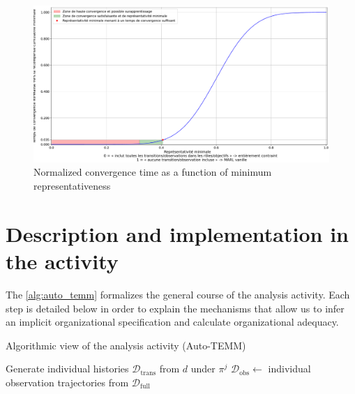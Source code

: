 \begin{itemize}
\begin{figure}[h!]
  \centering
  \includegraphics[trim=0cm 0cm 0cm 0cm, clip, width=1.\linewidth]{figures/convergence_time_relative_to_representativeness.pdf}
  \caption{Normalized convergence time as a function of minimum representativeness}
  \label {fig:conv_time_repr}
\end{figure}




\section{Description and implementation in the activity}

The \autoref{alg:auto_temm} formalizes the general course of the analysis activity.
Each step is detailed below in order to explain the mechanisms that allow us to infer an implicit organizational specification and calculate organizational adequacy.


\begin{algorithm}[h!]
  \caption{Algorithmic view of the analysis activity (Auto-TEMM)}
  \label{alg:auto_temm}
  \DontPrintSemicolon



  Generate individual histories $\mathcal{D}_{\text{trans}}$ from $d$ under $\pi^j$ \;
  $\mathcal{D}_{\text{obs}} \gets$ individual observation trajectories from $\mathcal{D}_{\text{full}}$ \;



\end{algorithm}
\end{itemize}
